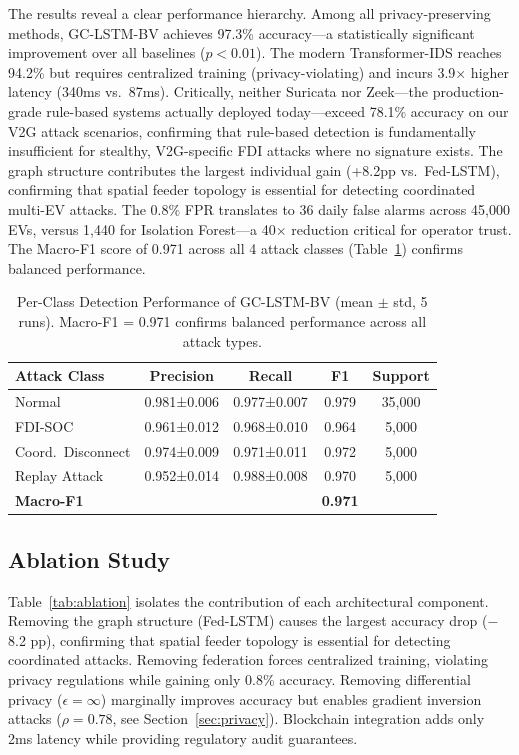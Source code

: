 \documentclass[journal]{IEEEtran}
\begin{document}
The results reveal a clear performance hierarchy. Among all privacy-preserving methods, GC-LSTM-BV achieves 97.3\% accuracy—a statistically significant improvement over all baselines ($p<0.01$). The modern Transformer-IDS reaches 94.2\% but requires centralized training (privacy-violating) and incurs 3.9$\times$ higher latency (340ms vs.\ 87ms). Critically, neither Suricata nor Zeek—the production-grade rule-based systems actually deployed today—exceed 78.1\% accuracy on our V2G attack scenarios, confirming that rule-based detection is fundamentally insufficient for stealthy, V2G-specific FDI attacks where no signature exists. The graph structure contributes the largest individual gain (+8.2pp vs.\ Fed-LSTM), confirming that spatial feeder topology is essential for detecting coordinated multi-EV attacks. The 0.8\% FPR translates to 36 daily false alarms across 45,000 EVs, versus 1,440 for Isolation Forest—a 40$\times$ reduction critical for operator trust. The Macro-F1 score of 0.971 across all 4 attack classes (Table~\ref{tab:perclass}) confirms balanced performance.

\begin{table}[t]
\caption{Per-Class Detection Performance of GC-LSTM-BV (mean $\pm$ std, 5 runs). Macro-F1 = 0.971 confirms balanced performance across all attack types.}
\label{tab:perclass}
\centering
\small
\begin{tabular}{lcccc}
\toprule
\textbf{Attack Class} & \textbf{Precision} & \textbf{Recall} & \textbf{F1} & \textbf{Support} \\
\midrule
Normal               & 0.981±0.006 & 0.977±0.007 & 0.979 & 35,000 \\
FDI-SOC              & 0.961±0.012 & 0.968±0.010 & 0.964 & 5,000 \\
Coord.\ Disconnect   & 0.974±0.009 & 0.971±0.011 & 0.972 & 5,000 \\
Replay Attack        & 0.952±0.014 & 0.988±0.008 & 0.970 & 5,000 \\
\midrule
\textbf{Macro-F1}    &             &             & \textbf{0.971} & \\
\bottomrule
\end{tabular}
\end{table}

\subsection{Ablation Study}

Table~\ref{tab:ablation} isolates the contribution of each architectural component. Removing the graph structure (Fed-LSTM) causes the largest accuracy drop ($-$8.2 pp), confirming that spatial feeder topology is essential for detecting coordinated attacks. Removing federation forces centralized training, violating privacy regulations while gaining only 0.8\% accuracy. Removing differential privacy ($\epsilon=\infty$) marginally improves accuracy but enables gradient inversion attacks ($\rho=0.78$, see Section~\ref{sec:privacy}). Blockchain integration adds only 2ms latency while providing regulatory audit guarantees.
\end{document}
